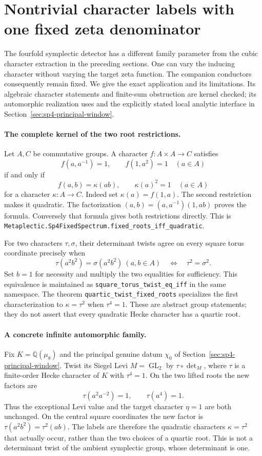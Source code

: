 \section{Nontrivial character labels with one fixed zeta denominator}
\label{sec:sp4-fixed-spectrum}

The fourfold symplectic detector has a different family parameter from
the cubic character extraction in the preceding sections. One can vary
the inducing character without varying the target zeta function. The
companion conductors consequently remain fixed. We give the exact
application and its limitations. Its algebraic character statements and
finite-sum obstruction are kernel checked; its automorphic realization
uses \cite[Section 6.5]{GaoInverseEis} and the explicitly stated local
analytic interface in Section~\ref{sec:sp4-principal-window}.

\paragraph{The complete kernel of the two root restrictions.}
Let \(A,C\) be commutative groups. A character \(f:A\times A\to C\)
satisfies
\[
 f(a,a^{-1})=1,\qquad f(1,a^2)=1\quad(a\in A)
\]
if and only if
\[
 f(a,b)=\kappa(ab),\qquad \kappa(a)^2=1\quad(a\in A)
\]
for a character \(\kappa:A\to C\). Indeed set
\(\kappa(a)=f(1,a)\). The second restriction makes it quadratic.
The factorization
\((a,b)=(a,a^{-1})(1,ab)\) proves the formula. Conversely that
formula gives both restrictions directly. This is
\texttt{Metaplectic.Sp4FixedSpectrum.fixed\_roots\_iff\_quadratic}.

For two characters \(\tau,\sigma\), their determinant twists agree
on every square torus coordinate precisely when
\[
 \tau(a^2b^2)=\sigma(a^2b^2)\ (a,b\in A)
 \quad\Longleftrightarrow\quad \tau^2=\sigma^2.
\]
Set \(b=1\) for necessity and multiply the two equalities for
sufficiency. This equivalence is maintained as
\texttt{square\_torus\_twist\_eq\_iff} in the same namespace.
The theorem \texttt{quartic\_twist\_fixed\_roots} specializes the
first characterization to \(\kappa=\tau^2\) when \(\tau^4=1\).
These are abstract group statements; they do not assert that every
quadratic Hecke character has a quartic root.

\paragraph{A concrete infinite automorphic family.}
Fix \(K=\mathbb Q(\mu_8)\) and the principal genuine datum
\(\chi_0\) of Section~\ref{sec:sp4-principal-window}.
Twist its Siegel Levi \(M=\operatorname{GL}_2\) by
\(\tau\circ\det_M\), where \(\tau\) is a finite-order Hecke
character of \(K\) with \(\tau^4=1\). On the two lifted roots the
new factors are
\[
 \tau(a^2a^{-2})=1,\qquad \tau(a^4)=1.
\]
Thus the exceptional Levi value and the target character \(\eta=1\)
are both unchanged. On the central square coordinates the new factor
is \(\tau(a^2b^2)=\tau^2(ab)\). The labels are therefore the
quadratic characters \(\kappa=\tau^2\) that actually occur, rather
than the two choices of a quartic root. This is not a determinant
twist of the ambient symplectic group, whose determinant is one.

